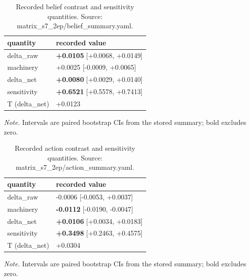 \documentclass[10pt]{article}
\begin{document}
\begin{table}[!t]
\centering
\footnotesize
\caption{ Recorded belief contrast and sensitivity quantities. Source: matrix\_s7\_2ep/belief\_summary.yaml. }

\begin{tabular}{ ll }
\toprule
quantity & recorded value \\
\midrule

delta\_raw & \textbf{+0.0105} [+0.0068, +0.0149] \\

machinery & +0.0025 [-0.0009, +0.0065] \\

delta\_net & \textbf{+0.0080} [+0.0029, +0.0140] \\

sensitivity & \textbf{+0.6521} [+0.5578, +0.7413] \\

T (delta\_net) & +0.0123 \\

\bottomrule
\end{tabular}

\par\footnotesize\emph{Note.} Intervals are paired bootstrap CIs from the stored summary; bold excludes zero.
\end{table}


\begin{table}[!t]
\centering
\footnotesize
\caption{ Recorded action contrast and sensitivity quantities. Source: matrix\_s7\_2ep/action\_summary.yaml. }

\begin{tabular}{ ll }
\toprule
quantity & recorded value \\
\midrule

delta\_raw & -0.0006 [-0.0053, +0.0037] \\

machinery & \textbf{-0.0112} [-0.0190, -0.0047] \\

delta\_net & \textbf{+0.0106} [+0.0034, +0.0183] \\

sensitivity & \textbf{+0.3498} [+0.2463, +0.4575] \\

T (delta\_net) & +0.0304 \\

\bottomrule
\end{tabular}

\par\footnotesize\emph{Note.} Intervals are paired bootstrap CIs from the stored summary; bold excludes zero.
\end{table}
\end{document}
